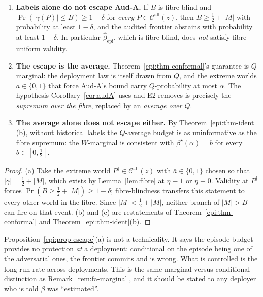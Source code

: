\begin{proposition}\label{epi:prop-escape}
\begin{enumerate}
\item[\textnormal{(a)}] \textbf{Labels alone do not escape Aud-A.} If $B$ is fibre-blind and
$\Pr(|\gamma(P)|\le B)\ge1-\delta$ for \emph{every} $P\in\mathcal C^{\mathrm{all}}(z)$, then
$B\ge\tfrac12+|M|$ with probability at least $1-\delta$, and the audited frontier abstains with
probability at least $1-\delta$. In particular $\widehat\beta_{\mathrm{epi}}$, which is fibre-blind,
does \emph{not} satisfy fibre-uniform validity.
\item[\textnormal{(b)}] \textbf{The escape is the average.} Theorem~\ref{epi:thm-conformal}'s
guarantee is $Q$-marginal: the deployment law is itself drawn from $Q$, and the extreme worlds
$\bar a\in\{0,1\}$ that force Aud-A's bound carry $Q$-probability at most $\alpha$. The
hypothesis Corollary~\ref{cor:audA} uses and E2 removes is precisely the \emph{supremum over the
fibre}, replaced by an \emph{average over $Q$}.
\item[\textnormal{(c)}] \textbf{The average alone does not escape either.} By
Theorem~\ref{epi:thm-ident}(b), without historical labels the $Q$-average budget is as
uninformative as the fibre supremum: the $W$-marginal is consistent with $\beta^\star(\alpha)=b$ for
every $b\in[0,\tfrac12]$.
\end{enumerate}
\end{proposition}

\begin{proof}
(a) Take the extreme world $P^\dagger\in\mathcal C^{\mathrm{all}}(z)$ with $\bar a\in\{0,1\}$ chosen
so that $|\gamma|=\tfrac12+|M|$, which exists by Lemma~\ref{lem:fibre} at $\eta\equiv1$ or
$\eta\equiv0$. Validity at $P^\dagger$ forces $\Pr(B\ge\tfrac12+|M|)\ge1-\delta$; fibre-blindness
transfers this statement to every other world in the fibre. Since $|M|<\tfrac12+|M|$, neither branch
of $|M|>B$ can fire on that event. (b) and (c) are restatements of Theorem~\ref{epi:thm-conformal}
and Theorem~\ref{epi:thm-ident}(b).
\end{proof}

\begin{remark}\label{epi:rem-marginal}
Proposition~\ref{epi:prop-escape}(a) is not a technicality. It says the episode budget provides no
protection \emph{at} a deployment: conditional on the episode being one of the adversarial ones, the
frontier commits and is wrong. What is controlled is the long-run rate across deployments. This is
the same marginal-versus-conditional distinction as Remark~\ref{rem:fa-marginal}, and it should be
stated to any deployer who is told $\beta$ was ``estimated''.
\end{remark}

